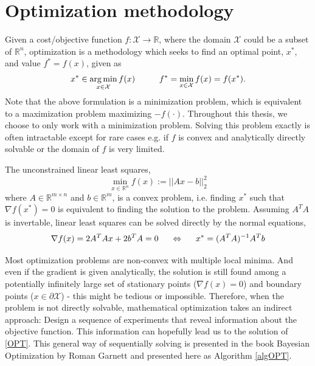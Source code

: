 \section{Optimization methodology}
Given a cost/objective function $f: \mathcal{X} \rightarrow \mathbb{R}$, where the domain
$\mathcal{X}$ could be a subset of $\mathbb{R}^n$,
optimization is a methodology which seeks to find an optimal point, $x^*$, and value
$f^* = f(x)$, given as
\begin{align}\label{OPT}
    x^* \in \operatorname*{arg\,min}_{x \in \mathcal{X}} f(x) \hspace{1cm} f^* = \min_{x \in \mathcal{X}} f(x) = f(x^*).
\end{align}
Note that the above formulation is a minimization problem, which is equivalent to a
maximization problem maximizing $-f(\cdot)$. Throughout this thesis, we choose to only work
with a minimization problem. 
Solving this problem exactly is often intractable except for rare cases e.g. if $f$ is 
convex and analytically directly solvable or the domain of $f$ is very limited.

\begin{testexample}
    The unconstrained linear least squares, $$\min_{x\in \mathbb{R}^n} f(x) := ||Ax-b||_2^2$$
    where $A \in \mathbb{R}^{m\times n}$ and $b \in \mathbb{R}^m$, is a convex problem,
    i.e. finding $x^*$ such that $\nabla f(x^*) = 0$ is equivalent to finding the solution
    to the problem. Assuming $A^TA$ is invertable, linear least squares can be solved
    directly by the normal equations, 
    $$\nabla f(x) = 2A^TAx + 2b^TA = 0 \hspace{0.5cm} \Leftrightarrow \hspace{0.5cm} x^* = (A^TA)^{-1} A^Tb$$
\end{testexample}

Most optimization problems are non-convex with multiple local minima. And even if the gradient is
given analytically, the solution is still found among a potentially infinitely large set of
stationary points ($\nabla f(x) = 0$) and boundary points ($x \in \partial \mathcal{X}$) - this
might be tedious or impossible. Therefore, when the problem is not directly solvable, mathematical optimization
takes an indirect approach: Design a sequence of experiments that reveal information about the
objective function. This information can hopefully lead us to the solution of \eqref{OPT}. This
general way of sequentially solving is presented in the book Bayesian Optimization by Roman Garnett
\cite{bayesoptbook} and presented here as Algorithm \ref{algOPT}. 

